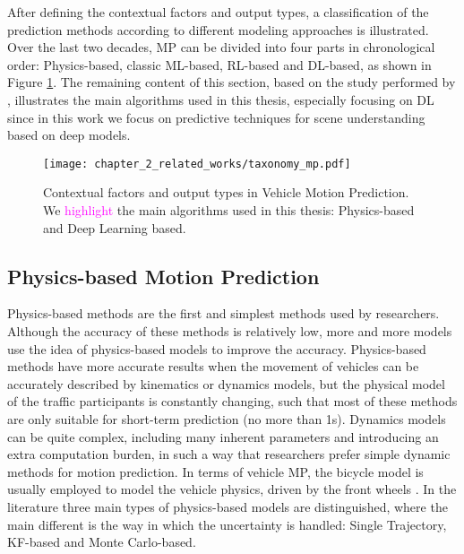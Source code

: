 After defining the contextual factors and output types, a classification of the prediction methods according to different modeling approaches is illustrated. Over the last two decades, \ac{MP} can be divided into four parts in chronological order: Physics-based, classic \ac{ML}-based, \ac{RL}-based and \ac{DL}-based, as shown in Figure \ref{fig:chapter_2_related_works/taxonomy_mp}. The remaining content of this section, based on the study performed by \cite{huang2022survey}, illustrates the main algorithms used in this thesis, especially focusing on \ac{DL} since in this work we focus on predictive techniques for scene understanding based on deep models.

\begin{figure}[h]
	\centering
	\texttt{[image: chapter\_2\_related\_works/taxonomy\_mp.pdf]}
	\caption[Contextual factors and output types in Vehicle Motion Prediction]{Contextual factors and output types in Vehicle Motion Prediction. We \textcolor{magenta}{highlight} the main algorithms used in this thesis: Physics-based and Deep Learning based.}
	\label{fig:chapter_2_related_works/taxonomy_mp}
\end{figure}

\subsection{Physics-based Motion Prediction}
\label{subsec:2_physics_based_mp}

Physics-based methods are the first and simplest methods used by researchers. Although the accuracy of these methods is relatively low, more and more models use the idea of physics-based models to improve the accuracy. Physics-based methods have more accurate results when the movement of vehicles can be accurately described by kinematics or dynamics models, but the physical model of the traffic participants is constantly changing, such that most of these methods are only suitable for short-term prediction (no more than 1s). Dynamics models can be quite complex, including many inherent parameters and introducing an extra computation burden, in such a way that researchers prefer simple dynamic methods for motion prediction. In terms of vehicle \ac{MP}, the bicycle model is usually employed to model the vehicle physics, driven by the front wheels \cite{kaempchen2009situation, pepy2006reducing}. In the literature three main types of physics-based models are distinguished, where the main different is the way in which the uncertainty is handled: Single Trajectory, \ac{KF}-based and Monte Carlo-based.

